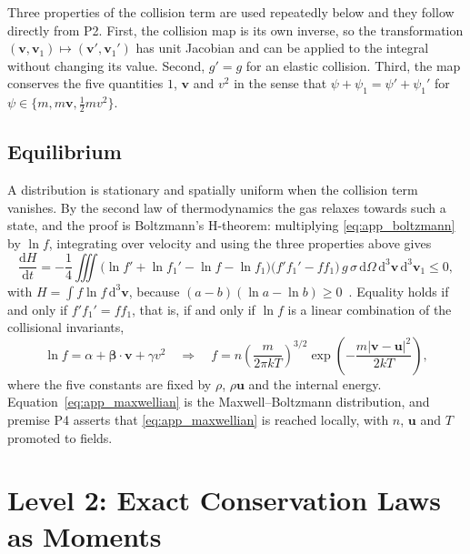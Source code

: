Three properties of the collision term are used repeatedly below and they follow directly from P2. First, the collision map is its own inverse, so the transformation $(\mathbf{v},\mathbf{v}_1)\mapsto(\mathbf{v}',\mathbf{v}_1')$ has unit Jacobian and can be applied to the integral without changing its value. Second, $g' = g$ for an elastic collision. Third, the map conserves the five quantities $1$, $\mathbf{v}$ and $v^2$ in the sense that $\psi + \psi_1 = \psi' + \psi_1'$ for $\psi \in \{m, m\mathbf{v}, \tfrac12 m v^2\}$.

\subsection{Equilibrium}

A distribution is stationary and spatially uniform when the collision term vanishes. By the second law of thermodynamics the gas relaxes towards such a state, and the proof is Boltzmann's H-theorem: multiplying \eqref{eq:app_boltzmann} by $\ln f$, integrating over velocity and using the three properties above gives
\begin{equation}
    \frac{\mathrm{d}H}{\mathrm{d}t} = -\frac{1}{4}\iiint \bigl(\ln f' + \ln f_1' - \ln f - \ln f_1\bigr)\bigl(f'f_1' - ff_1\bigr)\,g\,\sigma\,\mathrm{d}\Omega\,\mathrm{d}^3\mathbf{v}\,\mathrm{d}^3\mathbf{v}_1 \le 0 ,
    \label{eq:app_htheorem}
\end{equation}
with $H = \int f\ln f\,\mathrm{d}^3\mathbf{v}$, because $(a-b)(\ln a - \ln b) \ge 0$~\cite{cercignani1988}. Equality holds if and only if $f'f_1' = ff_1$, that is, if and only if $\ln f$ is a linear combination of the collisional invariants,
\begin{equation}
    \ln f = \alpha + \boldsymbol{\beta}\cdot\mathbf{v} + \gamma v^2
    \quad\Longrightarrow\quad
    f = n\left(\frac{m}{2\pi kT}\right)^{3/2}\exp\!\left(-\frac{m|\mathbf{v}-\mathbf{u}|^2}{2kT}\right) ,
    \label{eq:app_maxwellian}
\end{equation}
where the five constants are fixed by $\rho$, $\rho\mathbf{u}$ and the internal energy. Equation~\eqref{eq:app_maxwellian} is the Maxwell--Boltzmann distribution, and premise P4 asserts that \eqref{eq:app_maxwellian} is reached locally, with $n$, $\mathbf{u}$ and $T$ promoted to fields.

\section{Level 2: Exact Conservation Laws as Moments}
\label{app:moments}

